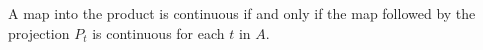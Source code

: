 A map into the product is continuous if and only if the map followed by the projection $P_t$ is continuous for each $t$ in $A$.

